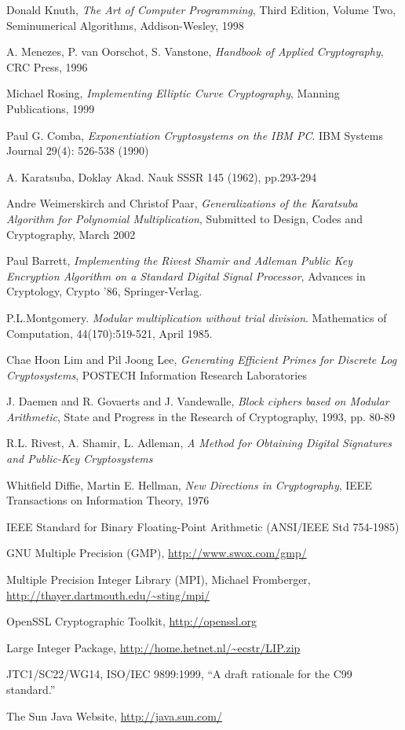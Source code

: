 \documentclass[b5paper]{book}
\begin{document}
\backmatter
\appendix
\begin{thebibliography}{ABCDEF}
Donald Knuth, \textit{The Art of Computer Programming}, Third Edition, Volume Two, Seminumerical Algorithms, Addison-Wesley, 1998

A. Menezes, P. van Oorschot, S. Vanstone, \textit{Handbook of Applied Cryptography}, CRC Press, 1996

Michael Rosing, \textit{Implementing Elliptic Curve Cryptography}, Manning Publications, 1999

Paul G. Comba, \textit{Exponentiation Cryptosystems on the IBM PC}. IBM Systems Journal 29(4): 526-538 (1990)

A. Karatsuba, Doklay Akad. Nauk SSSR 145 (1962), pp.293-294

Andre Weimerskirch and Christof Paar, \textit{Generalizations of the Karatsuba Algorithm for Polynomial Multiplication}, Submitted to Design, Codes and Cryptography, March 2002

Paul Barrett, \textit{Implementing the Rivest Shamir and Adleman Public Key Encryption Algorithm on a Standard Digital Signal Processor}, Advances in Cryptology, Crypto '86, Springer-Verlag.

P.L.Montgomery. \textit{Modular multiplication without trial division}. Mathematics of Computation, 44(170):519-521, April 1985.

Chae Hoon Lim and Pil Joong Lee, \textit{Generating Efficient Primes for Discrete Log Cryptosystems}, POSTECH Information Research Laboratories

J. Daemen and R. Govaerts and J. Vandewalle, \textit{Block ciphers based on Modular Arithmetic}, State and {P}rogress in the {R}esearch of {C}ryptography, 1993, pp. 80-89

R.L. Rivest, A. Shamir, L. Adleman, \textit{A Method for Obtaining Digital Signatures and Public-Key Cryptosystems}

Whitfield Diffie, Martin E. Hellman, \textit{New Directions in Cryptography}, IEEE Transactions on Information Theory, 1976

IEEE Standard for Binary Floating-Point Arithmetic (ANSI/IEEE Std 754-1985)

GNU Multiple Precision (GMP), \url{http://www.swox.com/gmp/}

Multiple Precision Integer Library (MPI), Michael Fromberger, \url{http://thayer.dartmouth.edu/~sting/mpi/}

OpenSSL Cryptographic Toolkit, \url{http://openssl.org}

Large Integer Package, \url{http://home.hetnet.nl/~ecstr/LIP.zip}

JTC1/SC22/WG14, ISO/IEC 9899:1999, ``A draft rationale for the C99 standard.''

The Sun Java Website, \url{http://java.sun.com/}

\end{thebibliography}


\end{document}
